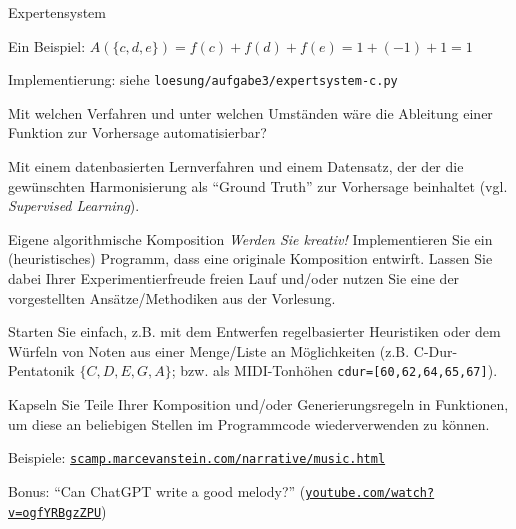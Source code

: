 \documentclass{uebungsblatt}
\begin{document}
\begin{aufgabe}{Expertensystem}
\begin{loesung}
		Ein Beispiel: $A(\{c,d,e\}) = f(c) + f(d) + f(e) = 1+(-1)+1 = 1$
		
		\medskip
		Implementierung: siehe \texttt{loesung/aufgabe3/expertsystem-c.py}
	\end{loesung}
	\begin{teilaufgabe}
		Mit welchen Verfahren und unter welchen Umständen wäre die Ableitung einer Funktion zur Vorhersage automatisierbar?
	\end{teilaufgabe}
	\begin{loesung}
		Mit einem datenbasierten Lernverfahren und einem Datensatz, der der die gewünschten Harmonisierung als \enquote{Ground Truth} zur Vorhersage beinhaltet (vgl. \emph{Supervised Learning}).
	\end{loesung}
\end{aufgabe}

\begin{aufgabe}{Eigene algorithmische Komposition}
	\emph{Werden Sie kreativ!}
	Implementieren Sie ein (heuristisches) Programm, dass eine originale Komposition entwirft.
	Lassen Sie dabei Ihrer Experimentierfreude freien Lauf und/oder nutzen Sie eine der vorgestellten Ansätze/Methodiken aus der Vorlesung.
	\begin{tipp}
		Starten Sie einfach, z.B. mit dem Entwerfen regelbasierter Heuristiken oder dem Würfeln von Noten aus einer Menge/Liste an Möglichkeiten (z.B. C-Dur-Pentatonik $\{C,D,E,G,A\}$; bzw. als MIDI-Tonhöhen \texttt{cdur=[60,62,64,65,67]}).
	\end{tipp}
	\begin{tipp}
		Kapseln Sie Teile Ihrer Komposition und/oder Generierungsregeln in Funktionen, um diese an beliebigen Stellen im Programmcode wiederverwenden zu können.
	\end{tipp}
	\begin{loesung}
		Beispiele: \href{http://scamp.marcevanstein.com/narrative/music.html}{\texttt{scamp.marcevanstein.com/narrative/music.html}}
		
		Bonus: \enquote{Can ChatGPT write a good melody?} (\href{https://www.youtube.com/watch?v=ogfYRBgzZPU}{\texttt{youtube.com/watch?v=ogfYRBgzZPU}})
	\end{loesung}
\end{aufgabe}
	
\end{document}
